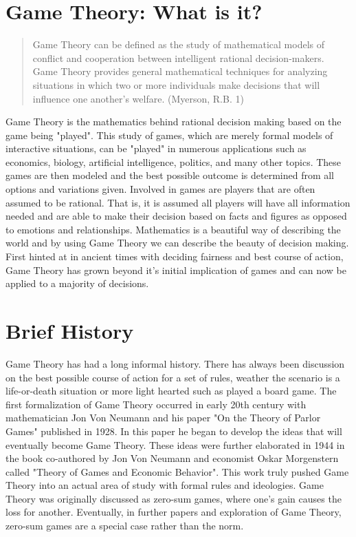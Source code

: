 \documentclass[12pt]{article}
\begin{document}
\pagestyle{fancy}  \chead{}
\lfoot{} \cfoot{} \rfoot{}

\section{Game Theory: What is it?}
 
\begin{quotation}
	 Game Theory can be defined as the study of mathematical models of
	conflict and cooperation between intelligent rational decision-makers.
	Game Theory provides general mathematical techniques for analyzing
	situations in which two or more individuals make decisions that will
	influence one another's welfare. (Myerson, R.B. 1)
\end{quotation}
	Game Theory is the mathematics behind rational decision making based on the game being "played". This study of games, which are merely formal models of interactive situations, can be "played" in numerous applications such as economics, biology, artificial intelligence, politics, and many other topics. These games are then modeled and the best possible outcome is determined from all options and variations given. Involved in games are players that are often assumed to be rational. That is, it is assumed all players will have all information needed and are able to make their decision based on facts and figures as opposed to emotions and relationships. Mathematics is a beautiful way of describing the world and by using Game Theory we can describe the beauty of decision making. First hinted at in ancient times with deciding fairness and best course of action, Game Theory has grown beyond it's initial implication of games and can now be applied to a majority of decisions.
\section{Brief History}
	Game Theory has had a long informal history. There has always been discussion on the best possible course of action for a set of rules, weather the scenario is a life-or-death situation or more light hearted such as played a board game. The first formalization of Game Theory occurred in early 20th century with mathematician Jon Von Neumann and his paper "On the Theory of Parlor Games" published in 1928. In this paper he began to develop the ideas that will eventually become Game Theory. These ideas were further elaborated in 1944 in the book co-authored by Jon Von Neumann and economist Oskar Morgenstern called "Theory of Games and Economic Behavior". This work truly pushed Game Theory into an actual area of study with formal rules and ideologies. Game Theory was originally discussed as zero-sum games, where one's gain causes the loss for another. Eventually, in further papers and exploration of Game Theory, zero-sum games are a special case rather than the norm. 
\end{document}
